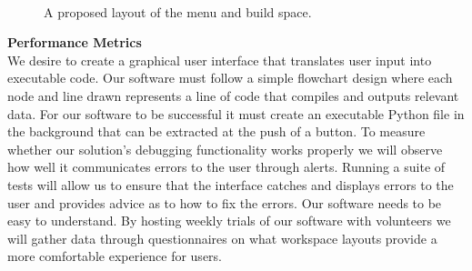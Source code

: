 \documentclass[a4paper,10pt]{IEEEtran} \usepackage[margin=1.0in]{geometry} \usepackage{pdfpages} \usepackage{graphicx}
\begin{document}
	\begin{figure}
	\begin{minipage}{\textwidth}
		\\
		\label{fig:fig1}
		\caption{A proposed layout of the menu and build space.}
	\end{minipage}
	\end{figure}
	\noindent \textbf{Performance Metrics}\\
	\indent We desire to create a graphical user interface that translates user input into executable code. 
	Our software must follow a simple flowchart design where each node and line drawn represents a line of code that compiles and outputs relevant data.
	For our software to be successful it must create an executable Python file in the background that can be extracted at the push of a button. 
	To measure whether our solution's debugging functionality works properly we will observe how well it communicates errors to the user through alerts.
	 Running a suite of tests will allow us to ensure that the interface catches and displays errors to the user and provides advice as to how to fix the errors.
	 Our software needs to be easy to understand.
	 By hosting weekly trials of our software with volunteers we will gather data through questionnaires on what workspace layouts provide a more comfortable experience for users.
	 
	 
	 
\end{document}
